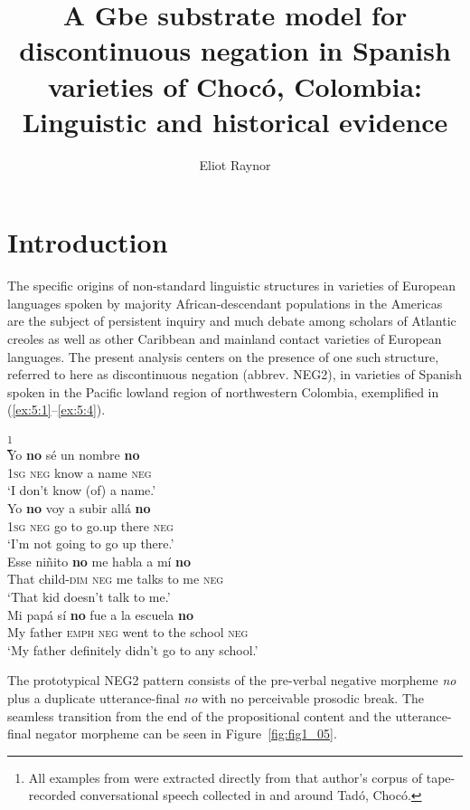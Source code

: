 \documentclass[output=paper,colorlinks,citecolor=brown]{langscibook}
\author{Eliot Raynor\orcid{}\affiliation{Indiana University, Bloomington;Princeton University}}
\title[A Gbe substrate model for discontinuous negation]
      {A Gbe substrate model for discontinuous negation in Spanish varieties of Chocó, Colombia: Linguistic and historical evidence}
\begin{document}
\maketitle


\section{Introduction}

The specific origins of non-standard linguistic structures in varieties of European languages spoken by majority African-descendant populations in the Americas are the subject of persistent inquiry and much debate among scholars of Atlantic creoles as well as other Caribbean and mainland contact varieties of European languages. The present analysis centers on the presence of one such structure, referred to here as discontinuous negation (abbrev. NEG2), in varieties of Spanish spoken in the Pacific lowland region of northwestern Colombia, exemplified in (\ref{ex:5:1}--\ref{ex:5:4}).


\ea \citep{RuizGarcia_2001}\footnote{All examples from \citet{RuizGarcia_2001} were extracted directly from that author’s corpus of tape-recorded conversational speech collected in and around Tadó, Chocó.}\\\label{ex:5:1}
  \gll Yo \textbf{no} sé un nombre \textbf{no}\\
       \textsc{1sg} \textsc{neg} know a name \textsc{neg}\\
  \glt ‘I don’t know (of) a name.’ 
\ex \citep{RuizGarcia_2001}\\
\gll Yo \textbf{no} voy a subir allá \textbf{no}\\
     \textsc{1sg} \textsc{neg} go to go.up there \textsc{neg}  \\
\glt ‘I’m not going to go up there.’
\ex  \citep{RuizGarcia_2001}\\\label{ex:5:3}
\gll Esse niñito \textbf{no} me habla a mí \textbf{no}\\
     That child-\textsc{dim} \textsc{neg} me talks to me \textsc{neg}  \\
\glt ‘That kid doesn’t talk to me.’
\ex \citep[109]{Schwegler_1991a}\\\label{ex:5:4}
\gll    Mi papá sí \textbf{no} fue a la escuela \textbf{no}\\
        My father \textsc{emph} \textsc{neg} went to the school \textsc{neg}\\
\glt ‘My father definitely didn’t go to any school.’
\z

The prototypical NEG2 pattern consists of the pre-verbal negative morpheme \emph{no} plus a duplicate utterance-final \emph{no} with no perceivable prosodic break. The seamless transition from the end of the propositional content and the utterance-final negator morpheme can be seen in Figure~\ref{fig:fig1_05}.  
\end{document}
